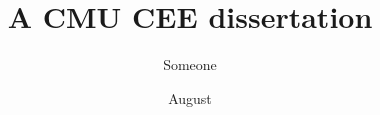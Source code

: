 \documentclass[12pt, pdftex, openany]{cmu_cee_dissertation}
\begin{document}
 

\frontmatter

\pagestyle{empty}

\title{\bf \textsf{A CMU CEE dissertation}}
\author{Someone}
\date{August}


\support{}
\disclaimer{}


\maketitle


\pagestyle{plain} %


\begin{acknowledgments}

  


\end{acknowledgments}

\begin{abstract}



\end{abstract}

\tableofcontents

\begin{listoftablesenv}
   \listoftables
\end{listoftablesenv}

\begin{listoffiguresenv}
   \listoffigures
\end{listoffiguresenv}

\begin{glossaryoftermsenv}
  
\clearpage
\printnoidxglossaries

\end{glossaryoftermsenv}
\end{document}
